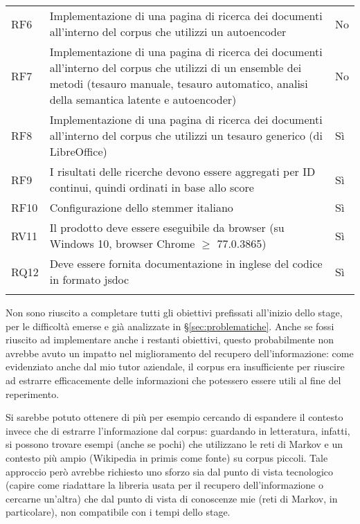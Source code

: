 \begin{longtable}{lp{}p{}}
        RF6 & Implementazione di una pagina di ricerca dei documenti all'interno del \gls{corpus} che utilizzi un \gls{autoencoder} & No\\ \addlinespace
        RF7 & Implementazione di una pagina di ricerca dei documenti all'interno del \gls{corpus} che utilizzi di un \gls{ensemble} dei metodi (tesauro manuale, tesauro automatico, analisi della semantica latente e \gls{autoencoder}) & No\\ \addlinespace
        RF8 & Implementazione di una pagina di ricerca dei documenti all'interno del \gls{corpus} che utilizzi un tesauro generico (di LibreOffice) & Sì\\ \addlinespace
        RF9 & I risultati delle ricerche devono essere aggregati per ID continui, quindi ordinati in base allo score & Sì \\ \addlinespace
        RF10 & Configurazione dello stemmer italiano & Sì \\ \addlinespace
        RV11 & Il prodotto deve essere eseguibile da browser (su Windows 10, browser Chrome $\geq$ 77.0.3865) & Sì \\ \addlinespace
        RQ12 & Deve essere fornita documentazione in inglese del codice in formato \gls{jsdoc} & Sì \\ \addlinespace
\label{tabella:requisitiCompletati}
\end{longtable}
Non sono riuscito a completare tutti gli obiettivi prefissati all'inizio dello stage,
per le difficoltà emerse e già analizzate in §\ref{sec:problematiche}.
Anche se fossi riuscito ad implementare anche i restanti obiettivi, questo probabilmente
non avrebbe avuto un impatto nel miglioramento del recupero dell'informazione:
come evidenziato anche dal mio tutor aziendale, il \gls{corpus} era insufficiente
per riuscire ad estrarre efficacemente delle informazioni che potessero essere utili 
al fine del reperimento.

Si sarebbe potuto ottenere di più per esempio cercando di espandere il contesto
invece che di estrarre l'informazione dal \gls{corpus}: guardando in letteratura,
infatti, si possono trovare esempi (anche se pochi) che utilizzano le reti di Markov
e un contesto più ampio (Wikipedia in primis come fonte) su \gls{corpus} piccoli. 
Tale approccio però avrebbe richiesto uno sforzo sia dal punto di vista tecnologico (capire
come riadattare la libreria usata per il recupero dell'informazione o cercarne 
un'altra) che dal punto di vista di conoscenze mie (reti di Markov, in particolare),
non compatibile con i tempi dello stage. 

